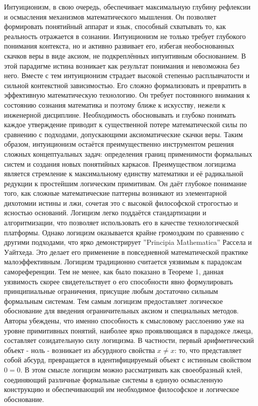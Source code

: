 \documentclass[12pt]{article}
\begin{document}
Интуиционизм, в свою очередь, обеспечивает максимальную глубину рефлексии и осмысления механизмов математического мышления. Он позволяет формировать понятийный аппарат и язык, способный схватывать то, как реальность отражается в сознании. Интуиционизм не только требует глубокого понимания контекста, но и активно развивает его, избегая необоснованных скачков веры в виде аксиом, не подкреплённых интуитивным обоснованием. В этой парадигме истина возникает как результат понимания и невозможна без него. Вместе с тем интуиционизм страдает высокой степенью расплывчатости и сильной контекстной зависимостью. Его сложно формализовать и превратить в эффективную математическую технологию. Он требует постоянного внимания к состоянию сознания математика и поэтому ближе к искусству, нежели к инженерной дисциплине. Необходимость обосновывать и глубоко понимать каждое утверждение приводит к существенной потере математической силы по сравнению с подходами, допускающими аксиоматические скачки веры. Таким образом, интуиционизм остаётся преимущественно инструментом решения сложных концептуальных задач: определения границ применимости формальных систем и создания новых понятийных каркасов. Преимуществом логицизма является стремление к максимальному единству математики и её радикальной редукции к простейшим логическим примитивам. Он даёт глубокое понимание того, как сложные математические паттерны возникают из элементарной дихотомии истины и лжи, сочетая это с высокой философской строгостью и ясностью оснований. Логицизм легко поддаётся стандартизации и алгоритмизации, что позволяет использовать его в качестве технологической платформы. Однако логицизм оказывается крайне громоздким по сравнению с другими подходами, что ярко демонстрирует ''Principia Mathematica'' Рассела и Уайтхеда. Это делает его применение в повседневной математической практике малоэффективным. Логицизм традиционно считается уязвимым к парадоксам самореференции. Тем не менее, как было показано в Теореме 1, данная уязвимость скорее свидетельствует о его способности явно формулировать принципиальные ограничения, присущие любым достаточно сильным формальным системам. Тем самым логицизм предоставляет логическое обоснование для введения ограничительных аксиом и специальных методов. Авторы убеждены, что именно способность к смысловому расслоению уже на уровне примитивных понятий, наиболее ярко проявляющаяся в парадоксе лжеца, составляет созидательную силу логицизма. В частности, первый арифметический объект - ноль - возникает из абсурдного свойства $x \neq x$: то, что представляет собой абсурд, превращается в идентифицируемый объект с истинным свойством $0 = 0$. В этом смысле логицизм можно рассматривать как своеобразный клей, соединяющий различные формальные системы в единую осмысленную конструкцию и обеспечивающий им необходимое философское и логическое обоснование.
\end{document}
